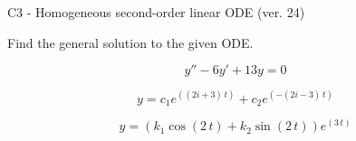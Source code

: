 \begin{exercise}
  \begin{exerciseTitle}C3 - Homogeneous second-order linear ODE (ver. 24)\end{exerciseTitle}
  \begin{exerciseStatement}
    
Find the general solution to the given ODE.

    
\[y''-6y'+13y = 0\]

  \end{exerciseStatement}
  \begin{exerciseAnswer}
    
\[y= c_{1} e^{\left(\left(2 i + 3\right) \, t\right)} + c_{2} e^{\left(-\left(2 i - 3\right) \, t\right)}\]

    
\[y= {\left(k_{1} \cos\left(2 \, t\right) + k_{2} \sin\left(2 \, t\right)\right)} e^{\left(3 \, t\right)}\]

  \end{exerciseAnswer}
\end{exercise}